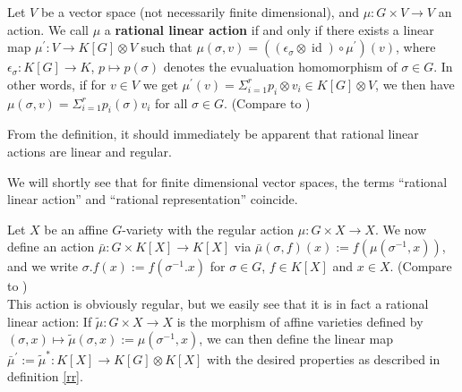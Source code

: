
\begin{definition}\label{rr}
  Let $V$ be a vector space (not necessarily finite dimensional), and $ \mu : G \times V \rightarrow V $ an action.
  We call $ \mu $ a \textbf{rational linear action} if and only if there exists a linear map $ \mu^\prime \colon V \rightarrow K[G] \otimes V $ such that $ \mu \left( \sigma , v \right) = \left( \left( \epsilon_\sigma \otimes \operatorname{id} \right) \circ \mu^\prime \right) \left(v\right) $, where $\epsilon_\sigma \colon K[G] \rightarrow K$, $p \mapsto p(\sigma)$ denotes the evualuation homomorphism of $\sigma \in G$.
  In other words, if for $v \in V$ we get $\mu^\prime(v) = \Sigma_{i=1}^rp_i \otimes v_i \in K[G]\otimes V$, we then have $\mu(\sigma,v) = \Sigma_{i=1}^r p_i(\sigma)v_i$ for all $\sigma \in G$.
  (Compare to \cite[A.1.7]{DK15})
\end{definition}

\begin{remark}
  From the definition, it should immediately be apparent that rational linear actions are linear and regular.
\end{remark}

We will shortly see that for finite dimensional vector spaces, the terms ``rational linear action'' and ``rational representation'' coincide.

\begin{definition}\label{funrep}
  Let $X$ be an affine $G$-variety with the regular action $\mu \colon G \times X \rightarrow X$.
  We now define an action $\bar{\mu} \colon G \times K[X] \rightarrow K[X]$ via $\bar{\mu}(\sigma,f)(x) := f(\mu(\sigma^{-1},x))$, and we write \linebreak$\sigma.f (x) := f( \sigma^{-1}.x )$ for  $\sigma \in G$, $f \in K[X]$ and $x \in X$.  (Compare to \cite[p.~31]{DK15})\\
  This action is obviously regular, but we easily see that it is in fact a rational linear action:
  If $\tilde{\mu} \colon G \times X \rightarrow X$ is the morphism of affine varieties defined by $ (\sigma,x)\mapsto\tilde{\mu} (\sigma,x) := \mu (\sigma^{-1},x)$, we can then define the linear map $ \bar{\mu}^\prime := \tilde{\mu}^\ast \colon K[X] \rightarrow K[G] \otimes K[X]$ with the desired properties as described in definition \ref{rr}.
\end{definition}

